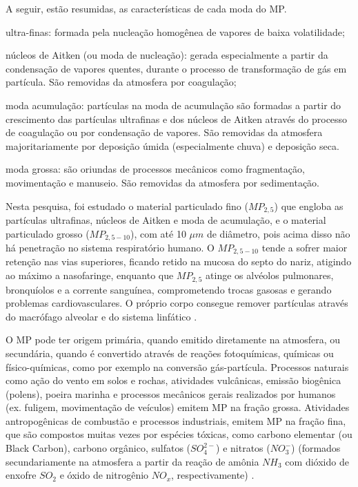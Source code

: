 A seguir, estão resumidas, as características de cada moda do MP.
\begin{itemize}
\begin{spacing}{1.0}
  \item ultra-finas: formada pela nucleação homogênea de vapores de baixa 
        volatilidade;
  \item núcleos de Aitken (ou moda de nucleação): 
        gerada especialmente a partir da condensação de vapores quentes, durante o processo 
        de transformação de gás em partícula. São removidas da atmosfera 
        por coagulação;%
  \item moda acumulação: 
        partículas na moda de acumulação são formadas a partir do crescimento 
        das partículas ultrafinas e dos núcleos de Aitken através do 
        processo de coagulação ou por condensação de vapores. São removidas da 
        atmosfera majoritariamente por deposição úmida (especialmente chuva) e deposição seca.%
  \item moda grossa:
        são oriundas de processos mecânicos como fragmentação, movimentação e 
        manuseio. São removidas da atmosfera por sedimentação.
\end{spacing}
\end{itemize}

Nesta pesquisa, foi estudado o material particulado fino ($MP_{2,5}$) que 
engloba as partículas ultrafinas, núcleos de Aitken e moda de acumulação, e
o material particulado grosso ($MP_{2,5-10}$), com até 10 $\mu m$ de diâmetro, 
pois acima disso não há penetração no sistema respiratório humano. O 
$MP_{2,5-10}$ tende a sofrer maior retenção nas vias superiores, 
ficando retido na mucosa do septo do nariz, atigindo ao
máximo a nasofaringe, enquanto que $MP_{2,5}$ atinge os alvéolos pulmonares, 
bronquíolos e a corrente sanguínea, comprometendo trocas gasosas e gerando
problemas cardiovasculares. O próprio corpo consegue remover partículas 
através do macrófago alveolar e do sistema linfático \citep{arbex2012}.

O MP pode ter origem primária, quando emitido diretamente na atmosfera, ou 
secundária, quando é convertido através de reações fotoquímicas, 
químicas ou físico-químicas, como por exemplo na conversão gás-partícula.
Processos naturais como ação do vento em solos e rochas, atividades vulcânicas, 
emissão biogênica (polens), poeira marinha e processos mecânicos gerais 
realizados por humanos (ex. fuligem, movimentação de veículos) emitem MP na 
fração grossa. 
Atividades antropogênicas de combustão e processos industriais, 
emitem MP na fração fina, que são compostos muitas
vezes por espécies tóxicas, como carbono elementar (ou Black Carbon), 
carbono orgânico, sulfatos ($SO_4^{2-}$) e nitratos ($NO_3^-$) (formados
secundariamente na atmosfera a partir da reação de amônia $NH_3$ com 
dióxido de enxofre $SO_2$ e óxido de nitrogênio $NO_x$, respectivamente) 
\citep{finlayson1999}. 

